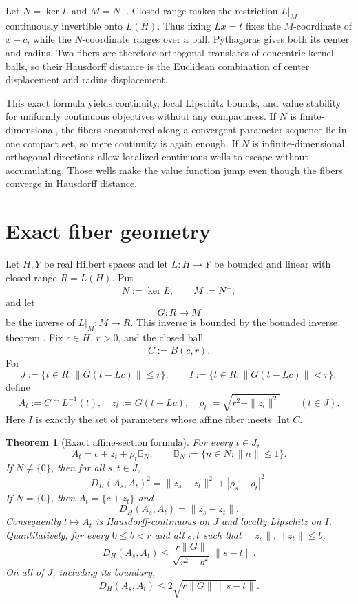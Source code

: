 \documentclass[11pt]{article}
\newcommand{\B}{\mathbb B}
\newcommand{\Int}{\operatorname{Int}}
\newtheorem{theorem}{Theorem}
\begin{document}
Let $N=\ker L$ and $M=N^\perp$.  Closed range makes the restriction
$L|_M$ continuously invertible onto $L(H)$.  Thus fixing $Lx=t$ fixes
the $M$-coordinate of $x-c$, while the $N$-coordinate ranges over a
ball.  Pythagoras gives both its center and radius.  Two fibers are therefore
orthogonal translates of concentric kernel-balls, so their Hausdorff distance
is the Euclidean combination of center displacement and radius displacement.

This exact formula yields continuity, local Lipschitz bounds, and value
stability for uniformly continuous objectives without any compactness.  If
$N$ is finite-dimensional, the fibers encountered along a convergent
parameter sequence lie in one compact set, so mere continuity is again
enough.  If $N$ is infinite-dimensional, orthogonal directions allow
localized continuous wells to escape without accumulating.  Those wells
make the value function jump even though the fibers converge in Hausdorff
distance.

\section{Exact fiber geometry}

Let $H,Y$ be real Hilbert spaces and let $L:H\to Y$ be bounded and linear
with closed range $R=L(H)$.  Put
\[
 N:=\ker L,\qquad M:=N^\perp,
\]
and let
\[
 G:R\longrightarrow M
\]
be the inverse of $L|_M:M\to R$.  This inverse is bounded by the bounded
inverse theorem \cite{Conway}.  Fix $c\in H$, $r>0$, and the closed ball
\[
 C:=\overline B(c,r).
\]
For
\[
 J:=\{t\in R:\|G(t-Lc)\|\le r\},\qquad
 I:=\{t\in R:\|G(t-Lc)\|<r\},
\]
define
\[
 A_t:=C\cap L^{-1}(t),\quad
 z_t:=G(t-Lc),\quad
 \rho_t:=\sqrt{r^2-\|z_t\|^2}\qquad(t\in J).
\]
Here $I$ is exactly the set of parameters whose affine fiber meets
$\Int C$.

\begin{theorem}[Exact affine-section formula]\label{thm:geometry}
For every $t\in J$,
\begin{equation}\label{eq:fiber}
 A_t=c+z_t+\rho_t\B_N,
 \qquad \B_N:=\{n\in N:\|n\|\le1\}.
\end{equation}
If $N\ne\{0\}$, then for all $s,t\in J$,
\begin{equation}\label{eq:exactH}
 D_H(A_s,A_t)^2
 =\|z_s-z_t\|^2+|\rho_s-\rho_t|^2.
\end{equation}
If $N=\{0\}$, then $A_t=\{c+z_t\}$ and
\begin{equation}\label{eq:trivialH}
 D_H(A_s,A_t)=\|z_s-z_t\|.
\end{equation}
Consequently $t\mapsto A_t$ is Hausdorff-continuous on $J$ and locally
Lipschitz on $I$.  Quantitatively, for every $0\le b<r$ and all $s,t$
such that $\|z_s\|,\|z_t\|\le b$,
\begin{equation}\label{eq:localLip}
 D_H(A_s,A_t)
 \le \frac{r\|G\|}{\sqrt{r^2-b^2}}\,\|s-t\|.
\end{equation}
On all of $J$, including its boundary,
\begin{equation}\label{eq:holder}
 D_H(A_s,A_t)
 \le 2\sqrt{r\|G\|\,\|s-t\|}.
\end{equation}
\end{theorem}
\end{document}
